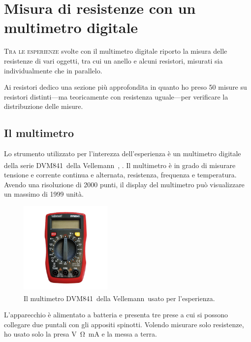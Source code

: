 \newcommand{\dvm}{DVM841}
\newcommand{\vell}{Vellemann\textsuperscript{\tiny\textregistered}}

\chapter{Misura di resistenze con un multimetro digitale}\label{ch:mult}
    \lettrine[loversize=0.08, lines=2]{T}{ra le esperienze} svolte con il multimetro digitale riporto la misura delle resistenze di vari oggetti, tra cui un anello e alcuni resistori, misurati sia individualmente che in parallelo.

    Ai resistori dedico una sezione più approfondita in quanto ho preso \num{50} misure su resistori distinti---ma teoricamente con resistenza uguale---per verificare la distribuzione delle misure.

    \section{Il multimetro}
        Lo strumento utilizzato per l'interezza dell'esperienza è un multimetro digitale della serie \dvm\ della \vell\ \cite{velleman-dvm841}, . Il multimetro è in grado di misurare tensione e corrente continua e alternata, resistenza, frequenza e temperatura. Avendo una risoluzione di \num{2000} punti, il display del multimetro può visualizzare un massimo di \num{1999} unità.
        \begin{figure}
            \centering
            \includegraphics[width = 0.4\textwidth]{images/multimetro/multimetro.jpg}
            \caption{Il multimetro \dvm\ della \vell\ usato per l'esperienza.}
            \label{fig:mul:multimetro}
        \end{figure}

        L'apparecchio è alimentato a batteria e presenta tre prese a cui si possono collegare due puntali con gli appositi spinotti. Volendo misurare solo resistenze, ho usato solo la presa \unit{\volt\ohm\milli\ampere} e la messa a terra.

